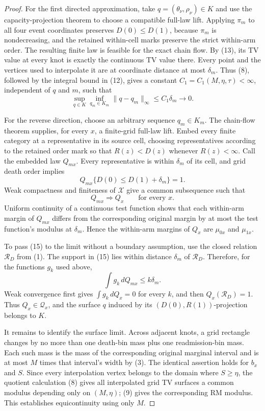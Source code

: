 \documentclass{article}
\begin{document}
\begin{proof}
For the first directed approximation, take \(q=(\theta_\nu,\rho_\nu)\in K\) and use the capacity-projection theorem to choose a compatible full-law lift.  Applying \(\pi_m\) to all four event coordinates preserves \(D(0)\leq D(1)\), because \(\pi_m\) is nondecreasing, and the retained within-cell marks preserve the strict within-arm order.  The resulting finite law is feasible for the exact chain flow.  By (13), its TV value at every knot is exactly the continuous TV value there.  Every point and the vertices used to interpolate it are at coordinate distance at most \(\delta_m\).  Thus (8), followed by the integral bound in (12), gives a constant \(C_1=C_1(M,\eta,\tau)<\infty\), independent of \(q\) and \(m\), such that
\[
 \sup_{q\in K}\inf_{q_m\in K_m}
 \|q-q_m\|_\infty
 \leq C_1\delta_m\longrightarrow0. \tag{14}
\]

For the reverse direction, choose an arbitrary sequence \(q_m\in K_m\).  The chain-flow theorem supplies, for every \(x\), a finite-grid full-law lift.  Embed every finite category at a representative in its source cell, choosing representatives according to the retained order mark so that \(R(z)<D(z)\) whenever \(R(z)<\infty\).  Call the embedded law \(Q_{mx}\).  Every representative is within \(\delta_m\) of its cell, and grid death order implies
\[
 Q_{mx}\{D(0)\leq D(1)+\delta_m\}=1. \tag{15}
\]
Weak compactness and finiteness of \(\mathcal X\) give a common subsequence such that
\[
 Q_{mx}\Rightarrow Q_x\qquad\text{for every }x. \tag{16}
\]
Uniform continuity of a continuous test function shows that each within-arm margin of \(Q_{mx}\) differs from the corresponding original margin by at most the test function's modulus at \(\delta_m\).  Hence the within-arm margins of \(Q_x\) are \(\mu_{0x}\) and \(\mu_{1x}\).

To pass (15) to the limit without a boundary assumption, use the closed relation \(\mathcal R_D\) from (1).  The support in (15) lies within distance \(\delta_m\) of \(\mathcal R_D\).  Therefore, for the functions \(g_k\) used above,
\[
 \int g_k\,dQ_{mx}\leq k\delta_m.
\]
Weak convergence first gives \(\int g_k\,dQ_x=0\) for every \(k\), and then \(Q_x(\mathcal R_D)=1\).  Thus \(Q_x\in\mathcal Q_x\), and the surface \(q\) induced by its \((D(0),R(1))\)-projection belongs to \(K\).

It remains to identify the surface limit.  Across adjacent knots, a grid rectangle changes by no more than one death-bin mass plus one readmission-bin mass.  Each such mass is the mass of the corresponding original marginal interval and is at most \(M\) times that interval's width by (3).  The identical assertion holds for \(b_x\) and \(S\).  Since every interpolation vertex belongs to the domain where \(S\geq\eta\), the quotient calculation (8) gives all interpolated grid TV surfaces a common modulus depending only on \((M,\eta)\); (9) gives the corresponding RM modulus.  This establishes equicontinuity using only \(M\).


\end{proof}
\end{document}
